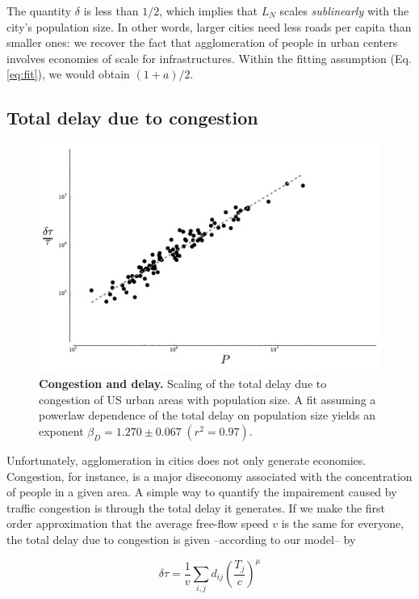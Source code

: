 The quantity $\delta$ is less than $1/2$, which implies that $L_N$ scales
\emph{sublinearly} with the city's population size. In other words, larger
cities need less roads per capita than smaller ones: we recover the fact that
agglomeration of people in urban centers involves economies of scale for
infrastructures. Within the fitting assumption (Eq.\ref{eq:fit}), we would
obtain $(1+a)/2$.

\subsection{Total delay due to congestion}

\begin{figure}
    \centering
    \includegraphics[width=\textwidth]{gfx/chapter-scaling/scaling_delay.pdf}
    \caption{{\bf Congestion and delay.} Scaling of the total delay due to congestion of US urban areas with
    population size. A fit assuming a powerlaw dependence of the total delay on
population size yields an exponent $\beta_D = 1.270 \pm 0.067\;(r^2=0.97)$.\label{fig:scaling_delay}}
\end{figure}

Unfortunately, agglomeration in cities does not only generate economies.
Congestion, for instance, is a major diseconomy associated with the
concentration of people in a given area. A simple way to quantify the
impairement caused by traffic congestion is through the total delay it
generates. If we make the first order approximation that the average free-flow
speed $v$ is the same for everyone, the total delay due to congestion is given
--according to our model-- by

\begin{equation} 
    \delta \tau = \frac{1}{v} \sum_{i,j} d_{ij} \left(\frac{T_j}{c} \right)^\mu 
\end{equation}


